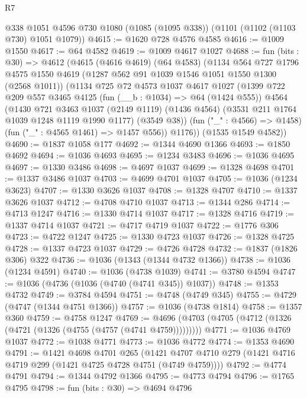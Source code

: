 \begin{lexlean}{R7}
\begin{coremodule}
    @338
    @1051
    @4596
    @730
    @1080
    (@1085 (@1095 @338))
    (@1101 (@1102 (@1103 @730) @1051 @1079))
@4615 := @1620 @728 @4576 @4585
@4616 := @1009 @1550
@4617 := @64 @4582
@4619 := @1009 @4617 @1027
@4688 := fun (bits : @30) =>
  @4612
    (@4615
      (@4616 @4619)
      (@64 @4583)
      (@1134
        @564
        @727
        @1796
        @4575
        @1550
        @4619
        (@1287 @562 @91 @1039 @1546 @1051 @1550 @1300 (@2568 @1011))
        (@1134
          @725
          @72
          @4573
          @1037
          @4617
          @1027
          (@1399
            @722
            @209
            @557
            @3465
            @4125
            (fun (__b : @1034) => @64 (@1424 @555))
            @4564
            (@1430
              @721
              @3463
              @1037
              (@2149 @1119)
              (@1436 @4564)
              (@3531 @211 @1764 @1039 @1248 @1119 @1990 @1177)
              (@3549 @38))
            (fun ("_" : @4566) => @1458)
            (fun ("_" : @4565 @1461) => @1457 @556))
          @1176))
      (@1535 @1549 @4582))
@4690 := @1837 @1058 @177
@4692 := @1344 @4690 @1366
@4693 := @1850 @4692
@4694 := @1036 @4693
@4695 := @1234 @3483
@4696 := @1036 @4695
@4697 := @1330 @3486
@4698 := @4697 @1037
@4699 := @1328 @4698
@4701 := @1337 @3486 @1037
@4703 := @4699 @4701 @1037
@4705 := @1036 (@1234 @3623)
@4707 := @1330 @3626 @1037
@4708 := @1328 @4707
@4710 := @1337 @3626 @1037
@4712 := @4708 @4710 @1037
@4713 := @1344 @286
@4714 := @4713 @1247
@4716 := @1330 @4714 @1037
@4717 := @1328 @4716
@4719 := @1337 @4714 @1037
@4721 := @4717 @4719 @1037
@4722 := @1776 @306
@4723 := @4722 @1247
@4725 := @1330 @4723 @1037
@4726 := @1328 @4725
@4728 := @1337 @4723 @1037
@4729 := @4726 @4728
@4732 := @1837 (@1826 @306) @322
@4736 := @1036 (@1343 (@1344 @4732 @1366))
@4738 := @1036 (@1234 @4591)
@4740 := @1036 (@4738 @1039)
@4741 := @3780 @4594
@4747 := @1036 (@4736 (@1036 (@4740 (@4741 @345)) @1037))
@4748 := @1353 @4732
@4749 := @3784 @4594
@4751 := @4748 (@4749 @345)
@4755 := @4729 (@4747 (@1344 @4751 @1366))
@4757 := @1036 (@4738 @1814)
@4758 := @1357 @360
@4759 := @4758 @1247
@4769 := @4696 (@4703 (@4705 (@4712 (@1326 (@4721 (@1326 (@4755 (@4757 (@4741 @4759)))))))))
@4771 := @1036 @4769 @1037
@4772 := @1038 @4771
@4773 := @1036 @4772
@4774 := @1353 @4690
@4791 := @1421
    @4698
    @4701
    @265
    (@1421 @4707 @4710 @279 (@1421 @4716 @4719 @299 (@1421 @4725 @4728 @4751 (@4749 @4759))))
@4792 := @4774 @4791
@4794 := @1344 @4792 @1366
@4795 := @4773 @4794
@4796 := @1765 @4795
@4798 := fun (bits : @30) => @4694 @4796

\end{coremodule}
\end{lexlean}
